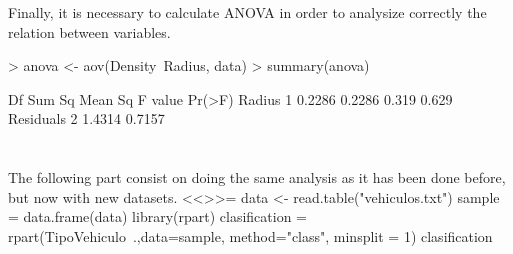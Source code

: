 \documentclass[a4paper]{article}
\begin{document}
Finally, it is necessary to calculate ANOVA in order to analysize correctly the relation between variables.

\begin{Schunk}
\begin{Sinput}
> anova <- aov(Density~Radius, data) 
> summary(anova)
\end{Sinput}
\begin{Soutput}
            Df Sum Sq Mean Sq F value Pr(>F)
Radius       1 0.2286  0.2286   0.319  0.629
Residuals    2 1.4314  0.7157               
\end{Soutput}
\end{Schunk}

\section{} The following part consist on doing the same analysis as it has been done before, but now with new datasets.
 <<>>=
data <- read.table("vehiculos.txt")
sample = data.frame(data)
library(rpart)
clasification = rpart(TipoVehiculo~.,data=sample, method="class", minsplit = 1)
clasification
\end{document}
